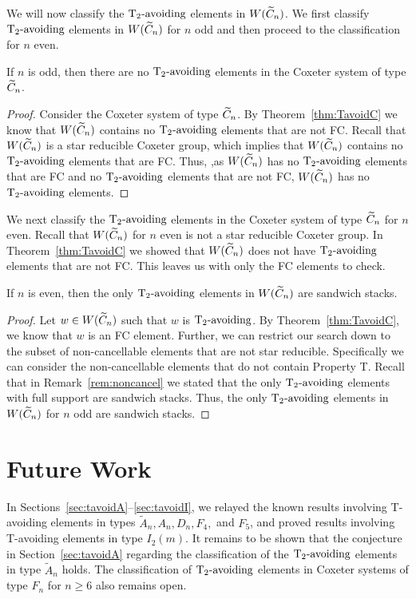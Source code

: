 We will now classify the $\operatorname{T_2-\mathrm{avoiding}}$ elements in $W(\widetilde{C}_n)$. We first classify $\operatorname{T_2-\mathrm{avoiding}}$ elements in $W(\widetilde{C}_n)$ for $n$ odd and then proceed to the classification for $n$ even.

\begin{theorem}
	If $n$ is odd, then there are no $\operatorname{T_2-\mathrm{avoiding}}$ elements in the Coxeter system of type $\widetilde{C}_n$.
	\begin{proof}
		Consider the Coxeter system of type $\widetilde{C}_n$. By Theorem~\ref{thm:TavoidC} we know that $W(\widetilde{C}_n)$ contains no $\operatorname{T_2-\mathrm{avoiding}}$ elements that are not FC. Recall that $W(\widetilde{C}_n)$ is a star reducible Coxeter group, which implies that $W(\widetilde{C}_n)$ contains no $\operatorname{T_2-\mathrm{avoiding}}$ elements that are FC. Thus, ,as $W(\widetilde{C}_n)$ has no $\operatorname{T_2-\mathrm{avoiding}}$ elements that are FC and no $\operatorname{T_2-\mathrm{avoiding}}$ elements that are not FC, $W(\widetilde{C}_n)$ has no $\operatorname{T_2-\mathrm{avoiding}}$ elements.
	\end{proof}
\end{theorem}

We next classify the $\operatorname{T_2-\mathrm{avoiding}}$ elements in the Coxeter system of type $\widetilde{C}_n$ for $n$ even. Recall that $W(\widetilde{C}_n)$ for $n$ even is not a star reducible Coxeter group. In Theorem~\ref{thm:TavoidC} we showed that $W(\widetilde{C}_n)$ does not have $\operatorname{T_2-\mathrm{avoiding}}$ elements that are not FC. This leaves us with only the FC elements to check.

\begin{theorem}
	If $n$ is even, then the only $\operatorname{T_2-\mathrm{avoiding}}$ elements in $W(\widetilde{C}_n)$ are sandwich stacks.
	\begin{proof}
		Let $w \in W(\widetilde{C}_n)$ such that $w$ is $\operatorname{T_2-\mathrm{avoiding}}$. By Theorem~\ref{thm:TavoidC}, we know that $w$ is an FC element. Further, we can restrict our search down to the subset of non-cancellable elements that are not star reducible. Specifically we can consider the non-cancellable elements that do not contain Property T. Recall that in Remark~\ref{rem:noncancel} we stated that the only $\operatorname{T_2-\mathrm{avoiding}}$ elements with full support are sandwich stacks. Thus, the only $\operatorname{T_2-\mathrm{avoiding}}$ elements in $W(\widetilde{C}_n)$ for $n$ odd are sandwich stacks.
	\end{proof}
\end{theorem}


\section{Future Work}\label{sec:open}
In Sections~\ref{sec:tavoidA}--\ref{sec:tavoidI}, we relayed the known results involving T-avoiding elements in types $\widetilde{A}_n, A_n, D_n, F_4,$ and $F_5$, and proved results involving T-avoiding elements in type $I_2(m)$. It remains to be shown that the conjecture in Section~\ref{sec:tavoidA} regarding the classification of the $\operatorname{T_2-\mathrm{avoiding}}$ elements in type $\widetilde{A}_n$ holds. The classification of $\operatorname{T_2-\mathrm{avoiding}}$ elements in Coxeter systems of type $F_n$ for $n \geq 6$ also remains open.


